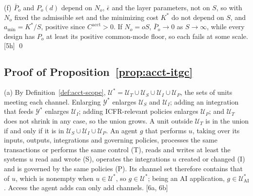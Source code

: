 (f) $\bar P_o$ and $P_o(d)$ depend on $N_o$, $\bar\epsilon$ and the layer parameters, not on $S$, so with $N_o$ fixed the admissible set and the minimizing cost $K^*$ do not depend on $S$, and $a_{\min}=K^*/S$, positive since $C^{\mathrm{acct}}>0$. If $N_o=oS$, $\bar P_o\to0$ as $S\to\infty$, while every design has $P_o$ at least its positive common-mode floor, so each fails at some scale. [5h] \qed

\subsection*{Proof of Proposition~\ref{prop:acct-itgc}}

(a) By Definition~\ref{def:acct-scope}, $\mathcal U^*=\mathcal U_T\cup\mathcal U_S\cup\mathcal U_I\cup\mathcal U_P$, the sets of units meeting each channel. Enlarging $\mathcal Y^*$ enlarges $\mathcal U_S$ and $\mathcal U_I$; adding an integration that feeds $\mathcal Y^*$ enlarges $\mathcal U_I$; adding ICFR-relevant policies enlarges $\mathcal U_P$; and $\mathcal U_T$ does not shrink in any case, so the union grows. A unit outside $\mathcal U_T$ is in the union if and only if it is in $\mathcal U_S\cup\mathcal U_I\cup\mathcal U_P$. An agent $g$ that performs $u$, taking over its inputs, outputs, integrations and governing policies, processes the same transactions or performs the same control (T), reads and writes at least the systems $u$ read and wrote (S), operates the integrations $u$ created or changed (I) and is governed by the same policies (P). Its channel set therefore contains that of $u$, which is nonempty when $u\in\mathcal U^*$, so $g\in\mathcal U^*$; being an AI application, $g\in\mathcal U^*_{\mathrm{AI}}$. Access the agent adds can only add channels. [6a, 6b]


